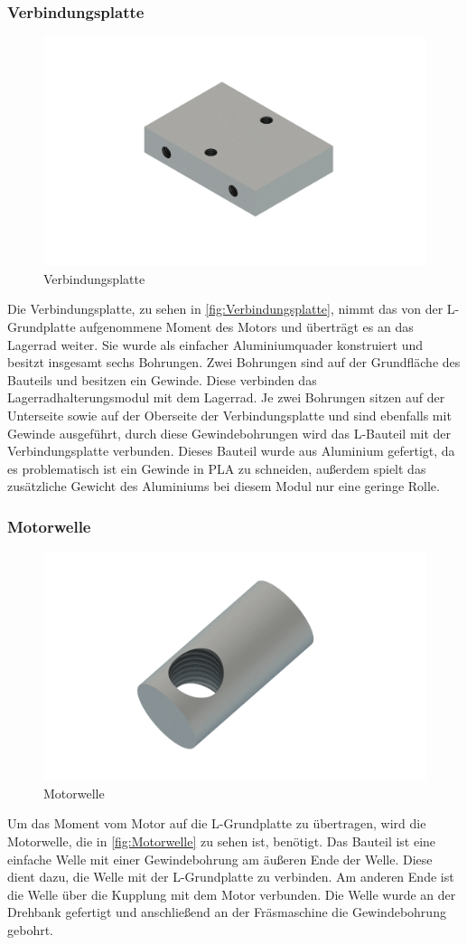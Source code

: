 \subsubsection{Verbindungsplatte}
\begin{figure}
    \includegraphics[width=8 cm]{fig/mech/Verbindungsplatte}
    \caption{Verbindungsplatte}
    \label{fig:Verbindungsplatte}
\end{figure}
Die Verbindungsplatte, zu sehen in \autoref{fig:Verbindungsplatte}, nimmt das von der L-Grundplatte aufgenommene Moment des Motors und überträgt es an das Lagerrad weiter.
Sie wurde als einfacher Aluminiumquader konstruiert und besitzt insgesamt sechs Bohrungen.
Zwei Bohrungen sind auf der Grundfläche des Bauteils und besitzen ein Gewinde.
Diese verbinden das Lagerradhalterungsmodul mit dem Lagerrad.
Je zwei Bohrungen sitzen auf der Unterseite sowie auf der Oberseite der Verbindungsplatte und sind ebenfalls mit Gewinde
ausgeführt, durch diese Gewindebohrungen wird das L-Bauteil mit der Verbindungsplatte verbunden.
Dieses Bauteil wurde aus Aluminium gefertigt, da es problematisch ist ein Gewinde in \acs{PLA} zu schneiden, außerdem spielt
das zusätzliche Gewicht des Aluminiums bei diesem Modul nur eine geringe Rolle.

\subsubsection{Motorwelle}
\begin{figure}
    \includegraphics[width=8 cm]{fig/mech/Motorwelle.png}
    \caption{Motorwelle}
    \label{fig:Motorwelle}
\end{figure}
Um das Moment vom Motor auf die L-Grundplatte zu übertragen, wird die Motorwelle, die in \autoref{fig:Motorwelle} zu sehen ist, benötigt.
Das Bauteil ist eine einfache Welle mit einer Gewindebohrung am äußeren Ende der Welle.
Diese dient dazu, die Welle mit der L-Grundplatte zu verbinden.
Am anderen Ende ist die Welle über die Kupplung mit dem Motor verbunden.
Die Welle wurde an der Drehbank gefertigt und anschließend an der Fräsmaschine die Gewindebohrung gebohrt.

